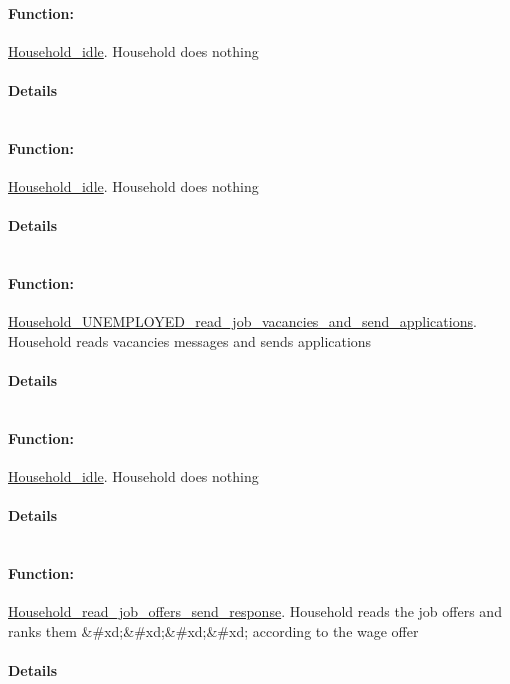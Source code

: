\documentclass[a4paper,11pt]{article}
\begin{document}
\paragraph{Function:}\url{Household_idle}.
Household does nothing
\paragraph{Details}
\begin{verbatim}
\end{verbatim}
\paragraph{Function:}\url{Household_idle}.
Household does nothing
\paragraph{Details}
\begin{verbatim}
\end{verbatim}
\paragraph{Function:}\url{Household_UNEMPLOYED_read_job_vacancies_and_send_applications}.
 Household reads vacancies messages and sends applications
\paragraph{Details}
\begin{verbatim}
\end{verbatim}
\paragraph{Function:}\url{Household_idle}.
Household does nothing
\paragraph{Details}
\begin{verbatim}
\end{verbatim}
\paragraph{Function:}\url{Household_read_job_offers_send_response}.
Household reads the job offers and ranks them \&\#xd;\&\#xd;\&\#xd;\&\#xd;
according to the wage offer
\paragraph{Details}
\begin{verbatim}
\end{verbatim}
\end{document}
